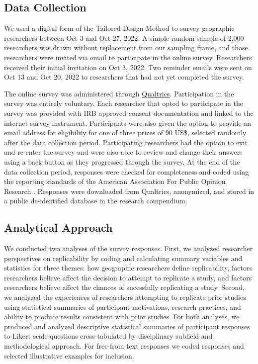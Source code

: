 \documentclass[]{interact}
\theoremstyle{plain}%
\theoremstyle{definition}
\theoremstyle{remark}
\begin{document}
\subsection*{Data Collection}
We used a digital form of the Tailored Design Method \citep{dillman2014internet} to survey geographic researchers between Oct 3 and Oct 27, 2022.
A simple random sample of 2,000 researchers was drawn without replacement from our sampling frame, and those researchers were invited via email to participate in the online survey. 
Researchers received their initial invitation on Oct 3, 2022. 
Two reminder emails were sent on Oct 13 and Oct 20, 2022 to researchers that had not yet completed the survey.

The online survey was administered through \href{https://www.qualtrics.com/}{Qualtrics}. 
Participation in the survey was entirely voluntary. 
Each researcher that opted to participate in the survey was provided with IRB approved consent documentation and linked to the internet survey instrument. 
Participants were also given the option to provide an email address for eligibility for one of three  prizes of 90 US\$, selected randomly after the data collection period.
Participating researchers had the option to exit and re-enter the survey and were also able to review and change their answers using a back button as they progressed through the survey.
At the end of the data collection period, responses were checked for completeness and coded using the reporting standards of the American Association For Public Opinion Research \citep{aaporstandards}.
Responses were downloaded from Qualtrics, anonymized, and stored in a public de-identified database in the research compendium.

\subsection*{Analytical Approach}

We conducted two analyses of the survey responses.
First, we analyzed researcher perspectives on replicability by coding and calculating summary variables and statistics for three themes: how geographic researchers define replicability, factors researchers believe affect the decision to attempt to replicate a study, and factors researchers believe affect the chances of sucessfully replicating a study.
Second, we analyzed the experiences of researchers attempting to replicate prior studies using statistical summaries of participant motivations, research practices, and ability to produce results consistent with prior studies.
For both analyses, we produced and analyzed descriptive statistical summaries of participant responses to Likert scale questions cross-tabulated by disciplinary subfield and methodological approach.
For free-from text responses we coded responses and selected illustrative examples for inclusion. 
\end{document}
